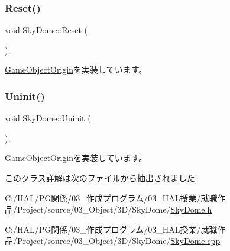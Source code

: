 \mbox{\label{class_sky_dome_abc6f8ed1471d7b03f25924a849cae590}} 
\subsubsection{\texorpdfstring{Reset()}{Reset()}}
{\footnotesize\ttfamily void Sky\+Dome\+::\+Reset (\begin{DoxyParamCaption}{ }\end{DoxyParamCaption})\hspace{0.3cm}{\ttfamily [override]}, {\ttfamily [virtual]}}



\mbox{\hyperlink{class_game_object_origin_af9af378a4fd9028316a6fdb461ed6a10}{Game\+Object\+Origin}}を実装しています。

\mbox{\label{class_sky_dome_a7fc71bfa671cf6e7ab26a194459b0753}} 
\subsubsection{\texorpdfstring{Uninit()}{Uninit()}}
{\footnotesize\ttfamily void Sky\+Dome\+::\+Uninit (\begin{DoxyParamCaption}{ }\end{DoxyParamCaption})\hspace{0.3cm}{\ttfamily [override]}, {\ttfamily [virtual]}}



\mbox{\hyperlink{class_game_object_origin_aeac8fc4a1f625982313a9a60dd35d016}{Game\+Object\+Origin}}を実装しています。



このクラス詳解は次のファイルから抽出されました\+:\begin{DoxyCompactItemize}
\item 
C\+:/\+H\+A\+L/\+P\+G関係/03\+\_\+作成プログラム/03\+\_\+\+H\+A\+L授業/就職作品/\+Project/source/03\+\_\+\+Object/3\+D/\+Sky\+Dome/\mbox{\hyperlink{_sky_dome_8h}{Sky\+Dome.\+h}}\item 
C\+:/\+H\+A\+L/\+P\+G関係/03\+\_\+作成プログラム/03\+\_\+\+H\+A\+L授業/就職作品/\+Project/source/03\+\_\+\+Object/3\+D/\+Sky\+Dome/\mbox{\hyperlink{_sky_dome_8cpp}{Sky\+Dome.\+cpp}}\end{DoxyCompactItemize}
